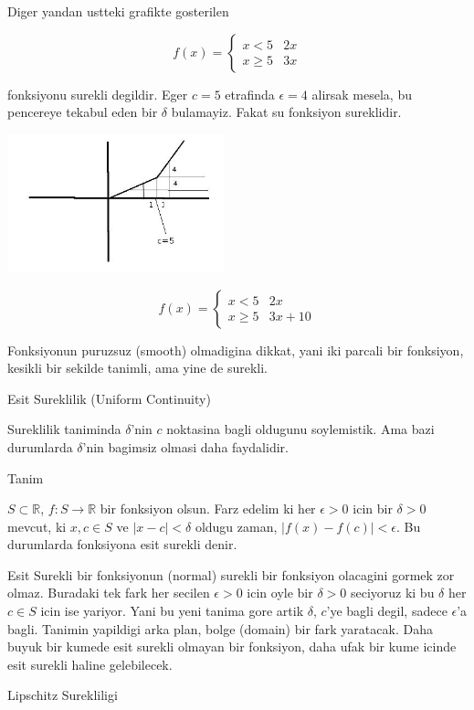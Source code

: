 \documentclass[12pt,fleqn]{article}\usepackage{../common}
\begin{document}
Diger yandan ustteki grafikte gosterilen 

\[ 
f(x) = 
\left\{ \begin{array}{ll}
x < 5 & 2x \\
x \ge 5 & 3x
\end{array} \right.
 \]

fonksiyonu surekli degildir. Eger $c=5$ etrafinda $\epsilon = 4$ alirsak
mesela, bu pencereye tekabul eden bir $\delta$ bulamayiz. Fakat su
fonksiyon sureklidir.

\includegraphics[height=4cm]{2_3.png}

\[ 
f(x) = 
\left\{ \begin{array}{ll}
x < 5 & 2x \\
x \ge 5 & 3x + 10
\end{array} \right.
 \]

Fonksiyonun puruzsuz (smooth) olmadigina dikkat, yani iki parcali bir
fonksiyon, kesikli bir sekilde tanimli, ama yine de surekli. 

Esit Sureklilik (Uniform Continuity) 

Sureklilik taniminda $\delta$'nin $c$ noktasina bagli oldugunu
soylemistik. Ama bazi durumlarda $\delta$'nin bagimsiz olmasi daha
faydalidir. 

Tanim

$S \subset \mathbb{R}$, $f:S \to \mathbb{R}$ bir fonksiyon olsun. Farz edelim ki her $\epsilon > 0$ icin 
bir $\delta > 0$ mevcut, ki $x,c \in S$ ve $|x-c| < \delta$ oldugu zaman, $|f(x) - f(c)| < \epsilon$. 
Bu durumlarda fonksiyona esit surekli denir. 

Esit Surekli bir fonksiyonun (normal) surekli bir fonksiyon olacagini
gormek zor olmaz. Buradaki tek fark her secilen $\epsilon > 0$ icin oyle
bir $\delta > 0$ seciyoruz ki bu $\delta$ her $c \in S$ icin ise
yariyor. Yani bu yeni tanima gore artik $\delta$, $c$'ye bagli degil,
sadece $\epsilon$'a bagli. Tanimin yapildigi arka plan, bolge (domain)
bir fark yaratacak. Daha buyuk bir kumede esit surekli olmayan bir
fonksiyon, daha ufak bir kume icinde esit surekli haline gelebilecek. 

Lipschitz Surekliligi 
\end{document}
